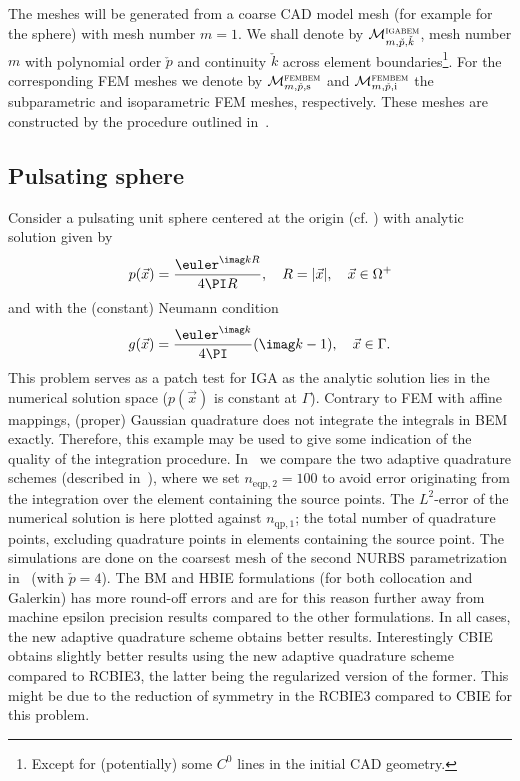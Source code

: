 The meshes will be generated from a coarse CAD model mesh (for example  for the sphere) with mesh number $m=1$. We shall denote by ${\cal M}_{m,\check{p},\check{k}}^{\textsc{igabem}}$, mesh number $m$ with polynomial order $\check{p}$ and continuity $\check{k}$ across element boundaries\footnote{Except for (potentially) some $C^0$ lines in the initial CAD geometry.}. For the corresponding FEM meshes we denote by ${\cal M}_{m,\check{p},\mathrm{s}}^{\textsc{fembem}}$ and ${\cal M}_{m,\check{p},\mathrm{i}}^{\textsc{fembem}}$ the subparametric and isoparametric FEM meshes, respectively. These meshes are constructed by the procedure outlined in~\cite[p. 191]{Venas2018iao}.

\subsection{Pulsating sphere}
\label{Sec3:pulsatingSphere}
Consider a pulsating unit sphere centered at the origin (cf. \cite{Simpson2014aib,Zheng2015itb}) with analytic solution given by
\begin{equation}
	p(\vec{x}) = \frac{\euler^{\imag kR}}{4\PI R},\quad R=|\vec{x}|,\quad \vec{x}\in\Omega^+
\end{equation}
and with the (constant) Neumann condition
\begin{equation}
	g(\vec{x}) = \frac{\euler^{\imag k}}{4\PI}(\imag k -1),\quad \vec{x}\in\Gamma.
\end{equation}
This problem serves as a patch test for IGA as the analytic solution lies in the numerical solution space ($p(\vec{x})$ is constant at $\Gamma$). Contrary to FEM with affine mappings, (proper) Gaussian quadrature does not integrate the integrals in BEM exactly. Therefore, this example may be used to give some indication of the quality of the integration procedure. In~ we compare the two adaptive quadrature schemes (described in~), where we set $n_{\mathrm{eqp},2}=100$ to avoid error originating from the integration over the element containing the source points. The $L^2$-error of the numerical solution is here plotted against $n_{\mathrm{qp},1}$; the total number of quadrature points, excluding quadrature points in elements containing the source point. The simulations are done on the coarsest mesh of the second NURBS parametrization in~ (with $\check{p}=4$). The BM and HBIE formulations (for both collocation and Galerkin) has more round-off errors and are for this reason further away from machine epsilon precision results compared to the other formulations. In all cases, the new adaptive quadrature scheme obtains better results. Interestingly CBIE obtains slightly better results using the new adaptive quadrature scheme compared to RCBIE3, the latter being the regularized version of the former. This might be due to the reduction of symmetry in the RCBIE3 compared to CBIE for this problem.

